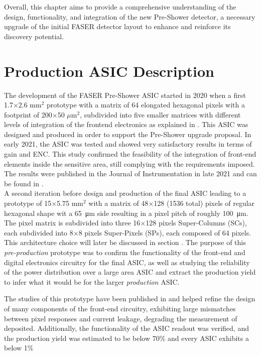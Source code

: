 Overall, this chapter aims to provide a comprehensive understanding of the design, functionality, and integration of the new Pre-Shower detector, a necessary upgrade of the initial FASER detector layout to enhance and reinforce its discovery potential.
	\clearpage 
	\section{Production ASIC Description }
	The development of the FASER Pre-Shower ASIC started in 2020 when a first 1.7$\times$2.6 mm$^2$ prototype with a matrix of 64 elongated hexagonal pixels with a footprint of 200$\times$50 $\mu$m$^2$, subdivided into five smaller matrices with different levels of integration of the frontend electronics as explained in \cite{FASER_proto0}. This ASIC was designed and produced in order to support the Pre-Shower upgrade proposal. In early 2021, the ASIC was tested and showed very satisfactory results in terms of gain and ENC. This study confirmed the feasibility of the integration of front-end elements inside the sensitive area, still complying with the requirements imposed. The results were published in the Journal of Instrumentation in late 2021 and can be found in \cite{FASER_proto0}. \\
	
	A second iteration before design and production of the final ASIC leading to a prototype of 15$\times$5.75 mm$^2$ with a matrix of 48$\times$128 (1536 total) pixels of regular hexagonal shape wit a \SI{65}{\micro\meter} side resulting in a pixel pitch of roughly \SI{100}{\micro\meter}. The pixel matrix is subdivided into three 16$\times$128 pixels Super-Columns (SCs), each subdivided into 8$\times$8 pixels Super-Pixels (SPs), each composed of 64 pixels. This architecture choice will later be discussed in section . The purpose of this \textit{pre-production} prototype was to confirm the functionality of the front-end and digital electronics circuitry for the final ASIC, as well as studying the reliability of the power distribution over a large area ASIC and extract the production yield to infer what it would be for the larger \textit{production} ASIC. 
	
	The studies of this prototype have been published in  and helped refine the design of many components of the front-end circuitry, exhibiting large mismatches between pixel responses and current leakage, degrading the measurement of deposited. Additionally, the functionality of the ASIC readout was verified, and the production yield was estimated to be below 70\% and every ASIC exhibits a below 1\% %
	
